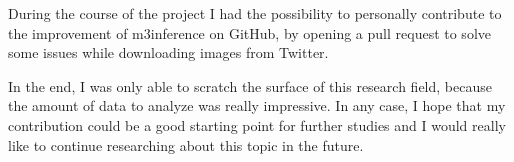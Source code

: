 During the course of the project I had the possibility to personally contribute to the improvement of m3inference on GitHub, by opening a pull request to solve some issues while downloading images from Twitter.

In the end, I was only able to scratch the surface of this research field, because the amount of data to analyze was really impressive. In any case, I hope that my contribution could be a good starting point for further studies and I would really like to continue researching about this topic in the future.
